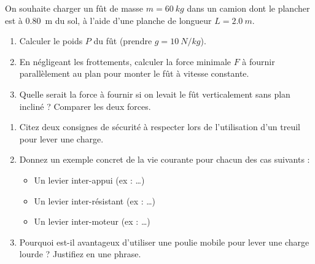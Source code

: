 \documentclass[11pt]{article}
\begin{document}
\begin{exercice}
On souhaite charger un fût de masse $m = \SI{60}{kg}$ dans un camion dont le plancher est à \SI{0,80}{m} du sol, à l'aide d'une planche de longueur $L = \SI{2,0}{m}$.
\begin{enumerate}
    \item Calculer le poids $P$ du fût (prendre $g = \SI{10}{N/kg}$).
    \item En négligeant les frottements, calculer la force minimale $F$ à fournir parallèlement au plan pour monter le fût à vitesse constante.
    \item Quelle serait la force à fournir si on levait le fût verticalement sans plan incliné ? Comparer les deux forces.
\end{enumerate}
\end{exercice}

\begin{exercice}
\begin{enumerate}
    \item Citez deux consignes de sécurité à respecter lors de l'utilisation d'un treuil pour lever une charge.
    \item Donnez un exemple concret de la vie courante pour chacun des cas suivants :
    \begin{itemize}
        \item Un levier inter-appui (ex : \ldots{})
        \item Un levier inter-résistant (ex : \ldots{})
        \item Un levier inter-moteur (ex : \ldots{})
    \end{itemize}
    \item Pourquoi est-il avantageux d'utiliser une poulie mobile pour lever une charge lourde ? Justifiez en une phrase.
\end{enumerate}
\end{exercice}
\end{document}

